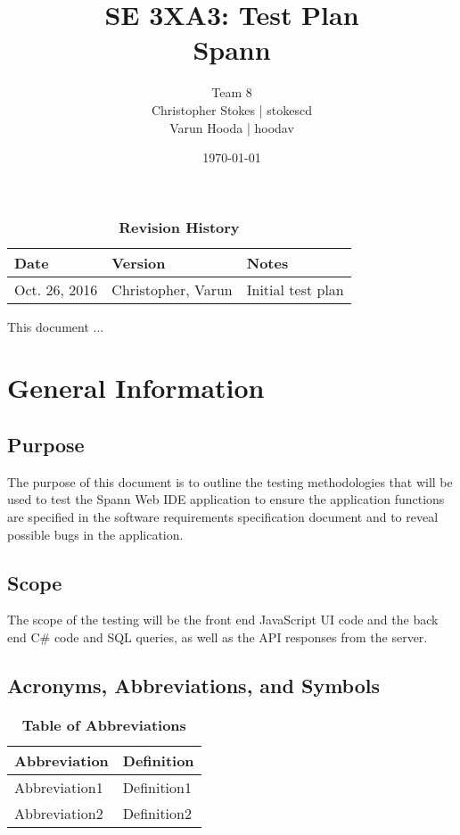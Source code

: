 \documentclass[12pt, titlepage]{article}
\title{SE 3XA3: Test Plan\\Spann}
\author{Team 8
		\\ Christopher Stokes | stokescd
		\\ Varun Hooda | hoodav
}
\date{\today}
\begin{document}
\maketitle

\tableofcontents
\listoftables
\listoffigures

\begin{table}[bp]
\caption{\bf Revision History}
\begin{tabularx}{\textwidth}{p{3cm}p{2cm}X}
\toprule {\bf Date} & {\bf Version} & {\bf Notes}\\
\midrule
    Oct. 26, 2016 & Christopher, Varun & Initial test plan\\
\bottomrule
\end{tabularx}
\end{table}

\newpage


This document ...

\section{General Information}

\subsection{Purpose}
The purpose of this document is to outline the testing methodologies that will
be used to test the Spann Web IDE application to ensure the application
functions are specified in the software requirements specification document and
to reveal possible bugs in the application.

\subsection{Scope}
The scope of the testing will be the front end JavaScript UI code and the back
end C\# code and SQL queries, as well as the API responses from the server.

\subsection{Acronyms, Abbreviations, and Symbols}
	
\begin{table}[hbp]
\caption{\textbf{Table of Abbreviations}} \label{Table}

\begin{tabularx}{\textwidth}{p{3cm}X}
\toprule
\textbf{Abbreviation} & \textbf{Definition} \\
\midrule
Abbreviation1 & Definition1\\
Abbreviation2 & Definition2\\
\bottomrule
\end{tabularx}

\end{table}
\end{document}
